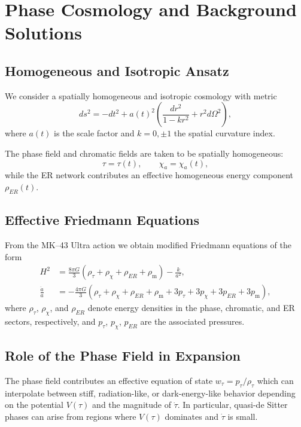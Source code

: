 \chapter{Phase Cosmology and Background Solutions}

\section{Homogeneous and Isotropic Ansatz}

We consider a spatially homogeneous and isotropic cosmology with metric
\[
  ds^2 = -dt^2 + a(t)^2 \left( \frac{dr^2}{1-kr^2} + r^2 d\Omega^2 \right),
\]
where $a(t)$ is the scale factor and $k=0,\pm 1$ the spatial curvature index.

The phase field and chromatic fields are taken to be spatially homogeneous:
\[
  \tau = \tau(t), \qquad \chi_a = \chi_a(t),
\]
while the ER network contributes an effective homogeneous energy component $\rho_{ER}(t)$.

\section{Effective Friedmann Equations}

From the MK--43 Ultra action we obtain modified Friedmann equations of the form
\begin{align}
  H^2 &=
  \frac{8\pi G}{3}\left(\rho_\tau + \rho_\chi + \rho_{ER} + \rho_{\mathrm{m}}\right)
  - \frac{k}{a^2},
  \\
  \frac{\ddot{a}}{a} &=
  -\frac{4\pi G}{3}\left(
    \rho_\tau + \rho_\chi + \rho_{ER} + \rho_{\mathrm{m}}
    + 3p_\tau + 3p_\chi + 3p_{ER} + 3p_{\mathrm{m}}
  \right),
\end{align}
where $\rho_\tau$, $\rho_\chi$, and $\rho_{ER}$ denote energy densities in the phase, chromatic, and ER sectors, respectively, and $p_\tau$, $p_\chi$, $p_{ER}$ are the associated pressures.

\section{Role of the Phase Field in Expansion}

The phase field contributes an effective equation of state $w_\tau = p_\tau/\rho_\tau$ which can interpolate between stiff, radiation-like, or dark-energy-like behavior depending on the potential $V(\tau)$ and the magnitude of $\dot{\tau}$.
In particular, quasi-de Sitter phases can arise from regions where $V(\tau)$ dominates and $\dot{\tau}$ is small.

